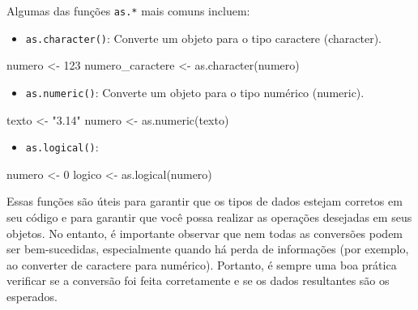 \documentclass[
  portuguese,
  letterpaper,
  DIV=11,
  numbers=noendperiod]{scrreprt}
\newenvironment{Shaded}{\begin{snugshade}}{\end{snugshade}}
\newcommand{\DecValTok}[1]{\textcolor[rgb]{0.68,0.00,0.00}{#1}}
\newcommand{\FunctionTok}[1]{\textcolor[rgb]{0.28,0.35,0.67}{#1}}
\newcommand{\NormalTok}[1]{\textcolor[rgb]{0.00,0.23,0.31}{#1}}
\newcommand{\OtherTok}[1]{\textcolor[rgb]{0.00,0.23,0.31}{#1}}
\newcommand{\StringTok}[1]{\textcolor[rgb]{0.13,0.47,0.30}{#1}}
\providecommand{\tightlist}{%
  \setlength{\itemsep}{0pt}\setlength{\parskip}{0pt}}
\theoremstyle{definition}
\theoremstyle{remark}
\begin{document}
Algumas das funções \texttt{as.*} mais comuns incluem:

\begin{itemize}
\tightlist
\item
  \texttt{as.character()}: Converte um objeto para o tipo caractere
  (character).
\end{itemize}

\begin{Shaded}
\begin{Highlighting}[]
\NormalTok{numero }\OtherTok{\textless{}{-}} \DecValTok{123}
\NormalTok{numero\_caractere }\OtherTok{\textless{}{-}} \FunctionTok{as.character}\NormalTok{(numero)}
\end{Highlighting}
\end{Shaded}

\begin{itemize}
\tightlist
\item
  \texttt{as.numeric()}: Converte um objeto para o tipo numérico
  (numeric).
\end{itemize}

\begin{Shaded}
\begin{Highlighting}[]
\NormalTok{texto }\OtherTok{\textless{}{-}} \StringTok{"3.14"}
\NormalTok{numero }\OtherTok{\textless{}{-}} \FunctionTok{as.numeric}\NormalTok{(texto)}
\end{Highlighting}
\end{Shaded}

\begin{itemize}
\tightlist
\item
  \texttt{as.logical()}:
\end{itemize}

\begin{Shaded}
\begin{Highlighting}[]
\NormalTok{numero }\OtherTok{\textless{}{-}} \DecValTok{0}
\NormalTok{logico }\OtherTok{\textless{}{-}} \FunctionTok{as.logical}\NormalTok{(numero)}
\end{Highlighting}
\end{Shaded}

Essas funções são úteis para garantir que os tipos de dados estejam
corretos em seu código e para garantir que você possa realizar as
operações desejadas em seus objetos. No entanto, é importante observar
que nem todas as conversões podem ser bem-sucedidas, especialmente
quando há perda de informações (por exemplo, ao converter de caractere
para numérico). Portanto, é sempre uma boa prática verificar se a
conversão foi feita corretamente e se os dados resultantes são os
esperados.
\end{document}
